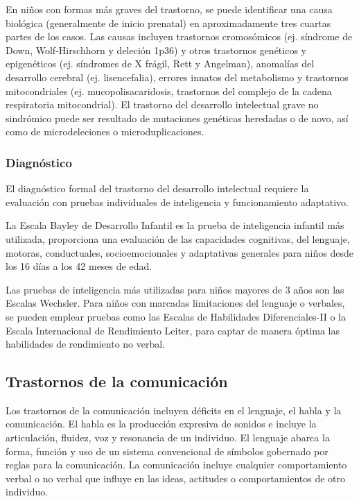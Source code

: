 \documentclass[11pt,letterpaper]{report}
\begin{document}
En niños con formas más graves del trastorno, se puede identificar una causa
biológica (generalmente de inicio prenatal) en aproximadamente tres cuartas
partes de los casos. Las causas incluyen trastornos cromosómicos (ej. síndrome
de Down, Wolf-Hirschhorn y deleción 1p36) y otros trastornos genéticos y
epigenéticos (ej. síndromes de X frágil, Rett y Angelman), anomalías del
desarrollo cerebral (ej. lisencefalia), errores innatos del metabolismo y
trastornos mitocondriales (ej. mucopolisacaridosis, trastornos del complejo de
la cadena respiratoria mitocondrial). El trastorno del desarrollo intelectual
grave no sindrómico puede ser resultado de mutaciones genéticas heredadas o de
novo, así como de microdeleciones o microduplicaciones. \cite{Nelson56}

\subsubsection{Diagnóstico}
El diagnóstico formal del trastorno del desarrollo intelectual requiere la
evaluación con pruebas individuales de inteligencia y funcionamiento
adaptativo.

La Escala Bayley de Desarrollo Infantil es la prueba de inteligencia infantil
más utilizada, proporciona una evaluación de las capacidades cognitivas, del
lenguaje, motoras, conductuales, socioemocionales y adaptativas generales para
niños desde los 16 días a los 42 meses de edad. \cite{Nelson56}

Las pruebas de inteligencia más utilizadas para niños mayores de 3 años son las
Escalas Wechsler. Para niños con marcadas limitaciones del lenguaje o verbales,
se pueden emplear pruebas como las Escalas de Habilidades Diferenciales-II o la
Escala Internacional de Rendimiento Leiter, para captar de manera óptima las
habilidades de rendimiento no verbal. \cite{Nelson56}

\subsection{Trastornos de la comunicación}
Los trastornos de la comunicación incluyen déficits en el lenguaje, el habla y
la comunicación. El habla es la producción expresiva de sonidos e incluye la
articulación, fluidez, voz y resonancia de un individuo. El lenguaje abarca la
forma, función y uso de un sistema convencional de símbolos gobernado por reglas
para la comunicación. La comunicación incluye cualquier comportamiento verbal o
no verbal que influye en las ideas, actitudes o comportamientos de otro
individuo. \cite{DSM5TR}
\end{document}
